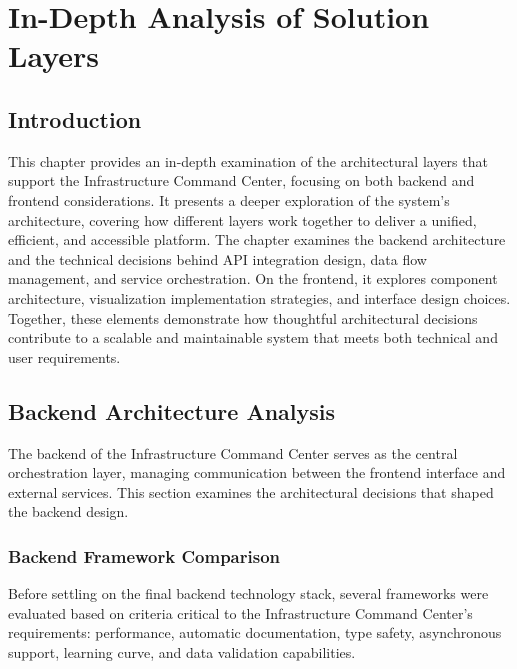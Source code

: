 \chapter{In-Depth Analysis of Solution Layers}

\section{Introduction}
This chapter provides an in-depth examination of the architectural layers that support the Infrastructure Command Center, focusing on both backend and frontend considerations. It presents a deeper exploration of the system's architecture, covering how different layers work together to deliver a unified, efficient, and accessible platform.
The chapter examines the backend architecture and the technical decisions behind API integration design, data flow management, and service orchestration. On the frontend, it explores component architecture, visualization implementation strategies, and interface design choices.
Together, these elements demonstrate how thoughtful architectural decisions contribute to a scalable and maintainable system that meets both technical and user requirements.

\section{Backend Architecture Analysis}

The backend of the Infrastructure Command Center serves as the central orchestration layer, managing communication between the frontend interface and external services. This section examines the architectural decisions that shaped the backend design.

\subsection{Backend Framework Comparison}

Before settling on the final backend technology stack, several frameworks were evaluated based on criteria critical to the Infrastructure Command Center's requirements: performance, automatic documentation, type safety, asynchronous support, learning curve, and data validation capabilities.

